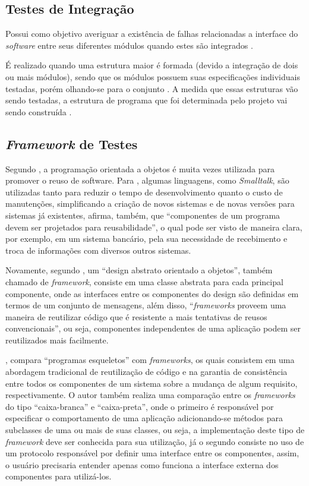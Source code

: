     \subsection{Testes de Integração}
        Possui como objetivo averiguar a existência de falhas relacionadas a interface do \textit{software} entre seus diferentes módulos quando estes são integrados \cite{artigo_intro_teste}.
        
        É realizado quando uma estrutura maior é formada (devido a integração de dois ou mais módulos), sendo que os módulos possuem suas especificações individuais testadas, porém olhando-se para o conjunto \cite{sw_test_tech}. A medida que essas estruturas vão sendo testadas, a estrutura de programa que foi determinada pelo projeto vai sendo construída \cite{maldonado}.

    \subsection{\textit{Framework} de Testes}
        Segundo , a programação orientada a objetos é muita vezes utilizada para promover o reuso de software. Para , algumas linguagens, como \textit{Smalltalk}, são utilizadas tanto para reduzir o tempo de desenvolvimento quanto o custo de manutenções, simplificando a criação de novos sistemas e de novas versões para sistemas já existentes, afirma, também, que “componentes de um programa devem ser projetados para reusabilidade”, o qual pode ser visto de maneira clara, por exemplo, em um sistema bancário, pela sua necessidade de recebimento e troca de informações com diversos outros sistemas.

        Novamente, segundo , um “design abstrato orientado a objetos”, também chamado de \textit{framework}, consiste em uma classe abstrata para cada principal componente, onde as interfaces entre os componentes do design são definidas em termos de um conjunto de mensagens, além disso, “\textit{frameworks} proveem uma maneira de reutilizar código que é resistente a mais tentativas de reusos convencionais”, ou seja, componentes independentes de uma aplicação podem ser reutilizados mais facilmente.

        , compara “programas esqueletos” com \textit{frameworks}, os quais consistem em uma abordagem tradicional de reutilização de código e na garantia de consistência entre todos os componentes de um sistema sobre a mudança de algum requisito, respectivamente. O autor também realiza uma comparação entre os \textit{frameworks} do tipo “caixa-branca” e “caixa-preta”, onde o primeiro é responsável por especificar o comportamento de uma aplicação adicionando-se métodos para subclasses de uma ou mais de suas classes, ou seja, a implementação deste tipo de \textit{framework} deve ser conhecida para sua utilização, já o segundo consiste no uso de um protocolo responsável por definir uma interface entre os componentes, assim, o usuário precisaria entender apenas como funciona a interface externa dos componentes para utilizá-los.

